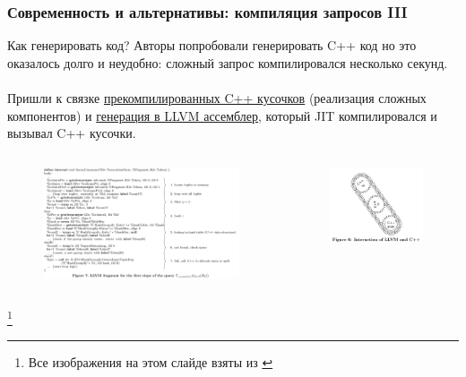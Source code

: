 \documentclass{beamer}
\begin{document}
\begin{frame}[fragile]
	\frametitle{Современность и альтернативы: компиляция запросов III}
	Как генерировать код? Авторы попробовали генерировать C++ код но это оказалось долго и неудобно: сложный запрос компилировался несколько секунд. 
	\\~\\
	Пришли к связке \underline{прекомпилированных C++ кусочков} (реализация сложных компонентов) и \underline{генерация в LLVM ассемблер}, который JIT компилировался и вызывал C++ кусочки.

	\begin{columns}
		\begin{column}{0.68\textwidth}	
			\begin{figure}[htb]
			\includegraphics[width=\textwidth,height=0.40\textheight,keepaspectratio]{compilation-4.png}
			\end{figure}
		\end{column}
		\begin{column}{0.28\textwidth}
			\begin{figure}[htb]
			\includegraphics[width=\textwidth,height=0.30\textheight,keepaspectratio]{compilation-1.png}
			\end{figure}			
		\end{column}
	\end{columns}
	\footnote{\tiny{Все изображения на этом слайде взяты из \cite{Neumann2011}}}
\end{frame}
\end{document}
